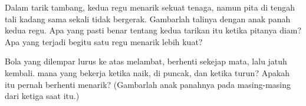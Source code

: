 \begin{exercise}[$\star\star$]\label{exo:g2:pushes-and-pulls:9}
Dalam tarik tambang, kedua regu menarik sekuat tenaga, namun pita di
tengah tali kadang sama sekali tidak bergerak. Gambarlah talinya
dengan anak panah kedua regu. Apa yang pasti benar tentang kedua
tarikan itu ketika pitanya diam? Apa yang terjadi begitu satu regu
menarik lebih kuat?
\end{exercise}

\begin{exercise}[$\star\star$]\label{exo:g2:pushes-and-pulls:10}
Bola yang dilempar lurus ke atas melambat, berhenti sekejap mata, lalu
jatuh kembali.  mana yang bekerja ketika naik, di puncak, dan
ketika turun? Apakah  itu pernah berhenti menarik? (Gambarlah anak
panahnya pada masing-masing dari ketiga saat itu.)
\end{exercise}
